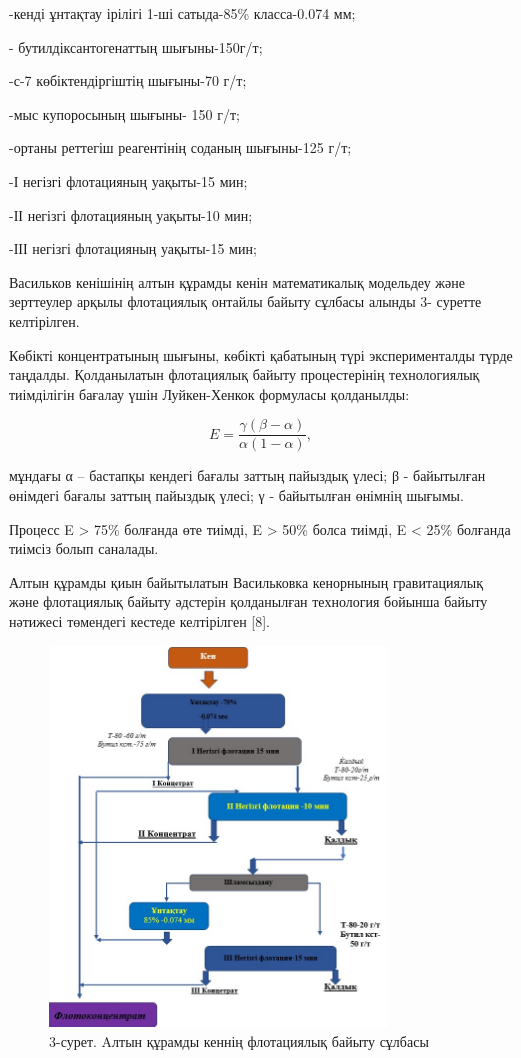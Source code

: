 \begin{multicols}{2}
-кенді ұнтақтау ірілігі 1-ші сатыда-85\% класса-0.074 мм;

- бутилдіксантогенаттың шығыны-150г/т;

-с-7 көбіктендіргіштің шығыны-70 г/т;

-мыс купоросының шығыны- 150 г/т;

-ортаны реттегіш реагентінің соданың шығыны-125 г/т;

-І негізгі флотацияның уақыты-15 мин;

-ІІ негізгі флотацияның уақыты-10 мин;

-ІІІ негізгі флотацияның уақыты-15 мин;

Васильков кенішінің алтын құрамды кенін математикалық модельдеу және
зерттеулер арқылы флотациялық онтайлы байыту сұлбасы алынды 3- суретте
келтірілген.

Көбікті концентратының шығыны, көбікті қабатының түрі эксперименталды
түрде таңдалды. Қолданылатын флотациялық байыту процестерінің
технологиялық тиімділігін бағалау үшін Луйкен-Хенкок формуласы
қолданылды:

\[E = \frac{\gamma(\beta - \alpha)}{\alpha(1 - \alpha)},\]

мұндағы α -- бастапқы кендегі бағалы заттың пайыздық үлесі; β -
байытылған өнімдегі бағалы заттың пайыздық үлесі; γ - байытылған өнімнің
шығымы.

Процесс E \textgreater{} 75\% болғанда өте тиімді, E \textgreater{} 50\%
болса тиімді, E \textless{} 25\% болғанда тиімсіз болып саналады.

Алтын құрамды қиын байытылатын Васильковка кенорнының гравитациялық және
флотациялық байыту әдстерін қолданылған технология бойынша байыту
нәтижесі төмендегі кестеде келтірілген {[}8{]}.
\end{multicols}

\begin{figure}[H]
	\centering
	\includegraphics[width=0.8\textwidth]{media/gor/image5}
	\caption*{3-сурет. Aлтын құрамды кеннің флотациялық байыту сұлбасы}
\end{figure}


